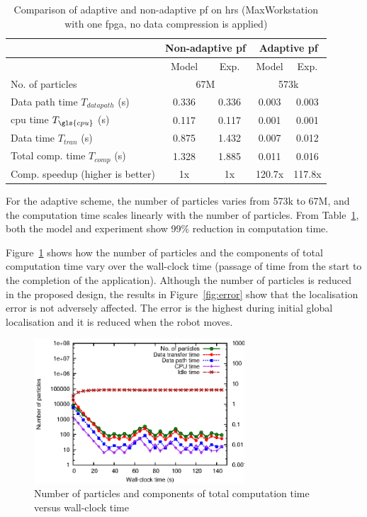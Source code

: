 \begin{table}[h]
	\centering
	\setlength{\tabcolsep}{5pt}
	\begin{spacing}{1.0}
	\caption{Comparison of adaptive and non-adaptive \gls{pf} on \gls{hrs} (MaxWorkstation with one \gls{fpga}, no data compression is applied)\label{tab:pf}}{
	\smallskip
		\begin{tabular}{l || c c | c c}
			\hline
			 \multirow{2}{*}{}  & \multicolumn{2}{|c|}{Non-adaptive \gls{pf}} & \multicolumn{2}{|c|}{Adaptive \gls{pf}} \\
			\hline
			  & Model & Exp. & Model & Exp. \\
			\hline
			\hline
			 No. of particles & \multicolumn{2}{|c|}{67M} & \multicolumn{2}{|c|}{573k} \\
			\hline
			 Data path time $T_{datapath}$ (s) 		& 0.336 & 0.336 & 0.003 & 0.003 \\
			 \gls{cpu} time $T_{\gls{cpu}}$ (s) 				& 0.117 & 0.117 & 0.001 & 0.001 \\
			 Data time $T_{tran}$ (s) 				& 0.875 & 1.432 & 0.007 & 0.012 \\
			 Total comp. time $T_{comp}$ (s)			& 1.328 & 1.885 & 0.011	& 0.016 \\
			\hline
			 Comp. speedup (higher is better)		& 1x	& 1x	& 120.7x	& 117.8x \\
			\hline
		\end{tabular}
	}
	\end{spacing}
\end{table}

For the adaptive scheme, the number of particles varies from 573k to 67M, and the computation time scales linearly with the number of particles.
From Table~\ref{tab:pf}, both the model and experiment show 99\% reduction in computation time.

Figure~\ref{fig:adaptive} shows how the number of particles and the components of total computation time vary over the wall-clock time (passage of time from the start to the completion of the application).
Although the number of particles is reduced in the proposed design, the results in Figure~\ref{fig:error} show that the localisation error is not adversely affected.
The error is the highest during initial global localisation and it is reduced when the robot moves.

\begin{figure}[t!]
\centering
\includegraphics[width=0.7\textwidth]{runtime_reconfiguration/figures/fig_adaptive}
\caption{Number of particles and components of total computation time versus wall-clock time}
\label{fig:adaptive}
\end{figure}

